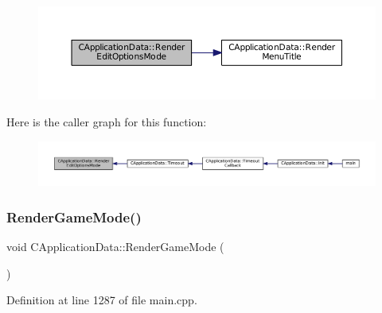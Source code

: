 \nopagebreak
\begin{figure}[H]
\begin{center}
\leavevmode
\includegraphics[width=350pt]{classCApplicationData_a7da1dd0b9a8d7c68d8df5f60b4e94189_cgraph}
\end{center}
\end{figure}
Here is the caller graph for this function\+:
\nopagebreak
\begin{figure}[H]
\begin{center}
\leavevmode
\includegraphics[width=350pt]{classCApplicationData_a7da1dd0b9a8d7c68d8df5f60b4e94189_icgraph}
\end{center}
\end{figure}
\hypertarget{classCApplicationData_ae5ba05c6fb7e6f0414c26f0b44bc842c}{}\label{classCApplicationData_ae5ba05c6fb7e6f0414c26f0b44bc842c} 
\subsubsection{\texorpdfstring{Render\+Game\+Mode()}{RenderGameMode()}}
{\footnotesize\ttfamily void C\+Application\+Data\+::\+Render\+Game\+Mode (\begin{DoxyParamCaption}{ }\end{DoxyParamCaption})\hspace{0.3cm}{\ttfamily [protected]}}



Definition at line 1287 of file main.\+cpp.


